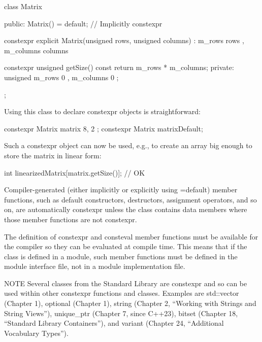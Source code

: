 \begin{cpp}
class Matrix
{
    public:
        Matrix() = default; // Implicitly constexpr

        constexpr explicit Matrix(unsigned rows, unsigned columns)
            : m_rows { rows }, m_columns { columns } { }

        constexpr unsigned getSize() const { return m_rows * m_columns; }
    private:
        unsigned m_rows { 0 }, m_columns { 0 };
};
\end{cpp}

Using this class to declare constexpr objects is straightforward:

\begin{cpp}
constexpr Matrix matrix { 8, 2 };
constexpr Matrix matrixDefault;
\end{cpp}

Such a constexpr object can now be used, e.g., to create an array big enough to store the matrix in linear form:

\begin{cpp}
int linearizedMatrix[matrix.getSize()]; // OK
\end{cpp}

Compiler-generated (either implicitly or explicitly using =default) member functions, such as default constructors, destructors, assignment operators, and so on, are automatically constexpr unless the class contains data members where those member functions are not constexpr.

The definition of constexpr and consteval member functions must be available for the compiler so they can be evaluated at compile time. This means that if the class is defined in a module, such member functions must be defined in the module interface file, not in a module implementation file.

\begin{myNotic}{NOTE}
Several classes from the Standard Library are constexpr and so can be used within other constexpr functions and classes. Examples are std::vector (Chapter 1), optional (Chapter 1), string (Chapter 2, “Working with Strings and String Views”), unique\_ptr (Chapter 7, since C++23), bitset (Chapter 18, “Standard Library Containers”), and variant (Chapter 24, “Additional Vocabulary Types”).
\end{myNotic}











